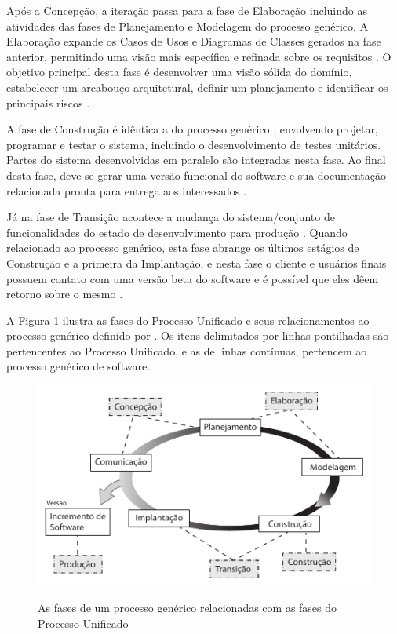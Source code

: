Após a Concepção, a iteração passa para a fase de Elaboração incluindo as atividades das fases de Planejamento e Modelagem do processo genérico. A Elaboração expande os Casos de Usos e Diagramas de Classes gerados na fase anterior, permitindo uma visão mais específica e refinada sobre os requisitos \cite{pressman06}. O objetivo principal desta fase é desenvolver uma visão sólida do domínio, estabelecer um arcabouço arquitetural, definir um planejamento e identificar os principais riscos \cite{sommerville10}.

A fase de Construção é idêntica a do processo genérico \cite{pressman06}, envolvendo projetar, programar e testar o sistema, incluindo o desenvolvimento de testes unitários. Partes do sistema desenvolvidas em paralelo são integradas nesta fase. Ao final desta fase, deve-se gerar uma versão funcional do software e sua documentação relacionada pronta para entrega aos interessados \cite{sommerville10}. 

Já na fase de Transição acontece a mudança do sistema/conjunto de funcionalidades do estado de desenvolvimento para produção \cite{sommerville10}. Quando relacionado ao processo genérico, esta fase abrange os últimos estágios de Construção e a primeira da Implantação, e nesta fase o cliente e usuários finais possuem contato com uma versão beta do software e é possível que eles dêem retorno sobre o mesmo  \cite{pressman06}.

A Figura \ref{fig:processo_unificado} ilustra as fases do Processo Unificado e seus relacionamentos ao processo genérico definido por . Os itens delimitados por linhas pontilhadas são pertencentes ao Processo Unificado, e as de linhas contínuas, pertencem ao processo genérico de software.

\begin{figure}[!h]
\centering
\caption{As fases de um processo genérico relacionadas com as fases do Processo Unificado}
\includegraphics{pdfs/img-processo-unificado.pdf}
\label{fig:processo_unificado} 
\end{figure}

